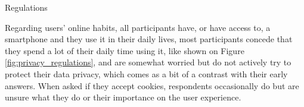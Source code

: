 Regulations

Regarding users' online habits, all participants have, or have access to, a smartphone
and they use it in their daily lives, most participants concede that they spend a lot
of their daily time using it, like shown on Figure \ref*{fig:privacy_regulations}, and are
somewhat worried but do not actively try to protect their data privacy, which
comes as a bit of a contrast with their early answers. When asked if they accept
cookies, respondents occasionally do but are unsure what they do or their
importance on the user experience.



